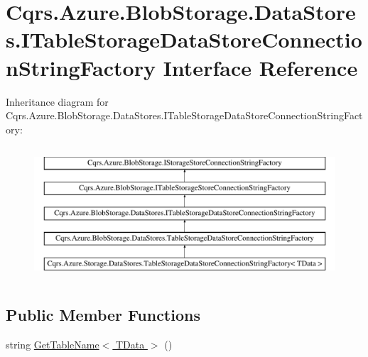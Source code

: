 \hypertarget{interfaceCqrs_1_1Azure_1_1BlobStorage_1_1DataStores_1_1ITableStorageDataStoreConnectionStringFactory}{}\section{Cqrs.\+Azure.\+Blob\+Storage.\+Data\+Stores.\+I\+Table\+Storage\+Data\+Store\+Connection\+String\+Factory Interface Reference}
\label{interfaceCqrs_1_1Azure_1_1BlobStorage_1_1DataStores_1_1ITableStorageDataStoreConnectionStringFactory}
Inheritance diagram for Cqrs.\+Azure.\+Blob\+Storage.\+Data\+Stores.\+I\+Table\+Storage\+Data\+Store\+Connection\+String\+Factory\+:\begin{figure}[H]
\begin{center}
\leavevmode
\includegraphics[height=5.000000cm]{interfaceCqrs_1_1Azure_1_1BlobStorage_1_1DataStores_1_1ITableStorageDataStoreConnectionStringFactory}
\end{center}
\end{figure}
\subsection*{Public Member Functions}
\begin{DoxyCompactItemize}
\item 
string \hyperlink{interfaceCqrs_1_1Azure_1_1BlobStorage_1_1DataStores_1_1ITableStorageDataStoreConnectionStringFactory_a40ff0417d18d0cf9d0f59d6dfddfaa15}{Get\+Table\+Name$<$ T\+Data $>$} ()
\end{DoxyCompactItemize}



